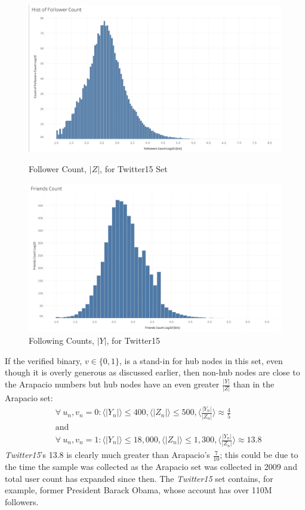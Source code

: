 \documentclass[preprint,review,12pt]{elsarticle}
\begin{document}
 \begin{figure}[h]
  \includegraphics[width=\linewidth]{Twitter15 Follower Count.png}
  \caption{Follower Count, $|Z|$, for Twitter15 Set}\label{fig:Twitter15 Follower}
\endminipage\hfill
{}
  \includegraphics[width=\linewidth]{Twitter15 FriendsCount.png}
  \caption{Following Counts, $|Y|$, for Twitter15}\label{fig:Twitter15 Following}
\endminipage\hfill
\end{figure}



If the verified binary, $v \in \{0,1\}$, is a stand-in for hub nodes in this set, even though it is overly generous as discussed earlier, then non-hub nodes are close to the Arapacio numbers but hub nodes have an even greater $\frac{|Y|}{|Z|}$ than in the Arapacio set:
\[
\begin{split}
& \forall \ u_n, v_n  = 0:\langle |Y_n| \rangle \leq 400, \langle |Z_n| \rangle \leq 500, \langle  \frac{|Y_n|}{|Z_n|} \rangle \approx \frac{4}{5} \\ &\text{and} \\ & \forall \ u_n, v_n  = 1:\langle |Y_n| \rangle \leq 18,000, \langle |Z_n| \rangle \leq 1,300, \langle  \frac{|Y_n|}{|Z_n|} \rangle \approx 13.8
\end{split}
\]
\textit{Twitter15}'s 13.8 is clearly much greater than Arapacio's $\frac{7}{10}$; this could be due to the time the sample was collected as the Arapacio set was collected in 2009 and total user count has expanded since then. The \textit{Twitter15} set contains, for example, former President Barack Obama, whose account has over 110M followers. 
\end{document}
